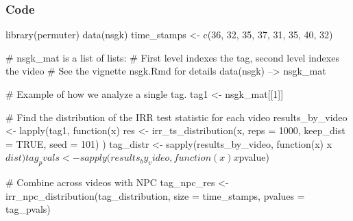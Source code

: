 \documentclass{beamer}
\begin{document}


\begin{frame}[fragile]
\frametitle{Code}
\begin{rcode}
library(permuter)
data(nsgk)
time_stamps <- c(36, 32, 35, 37, 31, 35, 40, 32)

# nsgk_mat is a list of lists:
# First level indexes the tag, second level indexes the video
# See the vignette nsgk.Rmd for details data(nsgk) --> nsgk_mat 

# Example of how we analyze a single tag.
tag1 <- nsgk_mat[[1]]

# Find the distribution of the IRR test statistic for each video
results_by_video <- lapply(tag1, function(x){
    res <- irr_ts_distribution(x, reps = 1000, keep_dist = TRUE, 
                               seed = 101)
    })
tag_distr    <- sapply(results_by_video, function(x) x$dist)
tag_pvals  <- sapply(results_by_video, function(x) x$pvalue)

# Combine across videos with NPC
tag_npc_res <- irr_npc_distribution(tag_distribution, 
                  size = time_stamps, pvalues = tag_pvals)

\end{rcode}

\end{frame}
\end{document}
